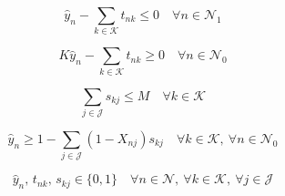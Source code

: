 \documentclass{article}
\begin{document}
\begin{equation}
\hat{y}_n - \sum_{k \in \mathcal{K}} t_{nk} \le 0
\quad \forall n \in \mathcal{N}_1
\tag{BP4-c}
\end{equation}

\begin{equation}
K \hat{y}_n - \sum_{k \in \mathcal{K}} t_{nk} \ge 0
\quad \forall n \in \mathcal{N}_0
\tag{BP4-d}
\end{equation}

\begin{equation}
\sum_{j \in \mathcal{J}} s_{kj} \le M
\quad \forall k \in \mathcal{K}
\tag{BP4-e}
\end{equation}

\begin{equation}
\hat{y}_n \ge 1 - \sum_{j \in \mathcal{J}} (1 - X_{nj}) s_{kj}
\quad \forall k \in \mathcal{K},\ \forall n \in \mathcal{N}_0
\tag{BP4-f}
\end{equation}

\begin{equation}
\hat{y}_n,\, t_{nk},\, s_{kj} \in \{0,1\}
\quad \forall n \in \mathcal{N},\ \forall k \in \mathcal{K},\ \forall j \in \mathcal{J}
\tag{BP4-g}
\end{equation}
\end{document}
